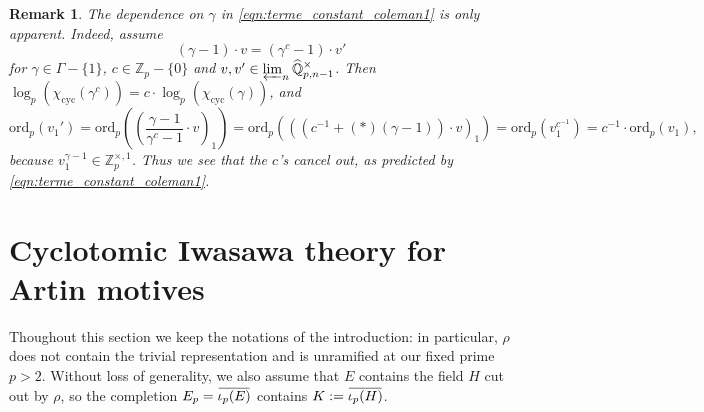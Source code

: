 \documentclass[12pt]{amsart}
\newcommand\bZ{\mathbb{Z}}
\newcommand\bQ{\mathbb{Q}}
\newcommand\Zp{{\mathbb{Z}_p}}
\newcommand{\ob}[1]{\mkern 1.5mu\overline{\mkern-1.5mu#1\mkern-1.5mu}\mkern 1.5mu}
\newcommand{\ord}{\mathrm{ord}}
\DeclareMathOperator{\cyc}{cyc}
\theoremstyle{defstyle}
\newtheorem{remark}[subsubsection]{Remark}
\theoremstyle{thmstyle}
\begin{document}
\begin{remark}
The dependence on $\gamma$ in \eqref{eqn:terme_constant_coleman1} is only apparent. Indeed, assume $$(\gamma-1)\cdot v=(\gamma^c-1)\cdot v'$$ 
	for $\gamma\in\Gamma-\{1\}$, $c\in\Zp-\{0\}$ and $v,v'\in\varprojlim_n \widehat{\bQ}_{p,n-1}^\times$. Then $\log_p(\chi_{\cyc}(\gamma^c))=c\cdot \log_p(\chi_{\cyc}(\gamma))$, and 
	$$\ord_p(v_1')= \ord_p((\frac{\gamma-1}{\gamma^c-1}\cdot v)_1)=  \ord_p(((c^{-1}+(*)(\gamma-1))\cdot v)_1)= \ord_p(v_1^{c^{-1}})=c^{-1}\cdot \ord_p(v_1),$$
	because $v_1^{\gamma-1}\in \bZ_{p}^{\times,1}$. Thus we see that the $c$'s cancel out, as predicted by \eqref{eqn:terme_constant_coleman1}.
\end{remark}

\section{Cyclotomic Iwasawa theory for Artin motives}\label{sec:iwasawa}
 Thoughout this section we keep the notations of the introduction: in particular, $\rho$ does not contain the trivial representation and is unramified at our fixed prime $p>2$. Without loss of generality, we also assume that $E$ contains the field $H$ cut out by $\rho$, so the completion $E_p=\ob{\iota_p(E)}$ contains $K:=\ob{\iota_p(H)}$. 
\end{document}
